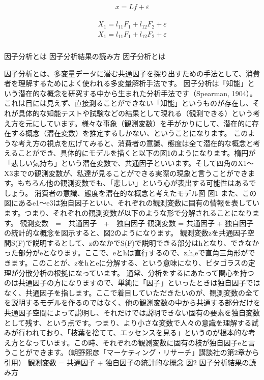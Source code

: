 \documentclass[a4j,11pt,mc, twocolumn]{jreport}
\begin{document}
		\begin{eqnarray}
		x=Lf+\varepsilon
		\end{eqnarray}

	\begin{eqnarray}
	\begin{split}
	X_1 =l_{11}F_1+l_{12}F_2+\varepsilon\\\nonumber
	X_1 =l_{11}F_1+l_{12}F_2+\varepsilon\\
	\end{split}
	\end{eqnarray}





%
%
%




	因子分析とは
	因子分析結果の読み方
	因子分析とは

	因子分析とは、多変量データに潜む共通因子を探り出すための手法として、消費者を理解するためによく使われる多変量解析手法です。
	因子分析は「知能」という潜在的な概念を研究する中から生まれた分析手法です（Spearman, 1904）。これは目には見えず、直接測ることができない「知能」というものが存在し、それが具体的な知能テストや試験などの結果として現れる（観測できる）という考え方を元にしています。様々な事象（観測変数）を手がかりにして、潜在的に存在する概念（潜在変数）を推定するしかない、ということになります。
	このような考え方の視点を広げてみると、消費者の意識、態度は全て潜在的な概念と考えることができ、具体的にモデルを描くと以下の図1のようになります。楕円が「悲しい気持ち」という潜在変数で、共通因子といいます。そして四角のX1～X3までの観測変数が、私達が見ることができる実際の現象と言うことができます。もちろん他の観測変数でも、「悲しい」という心が表出する可能性はあるでしょう。
	消費者の意識、態度を潜在的な概念と考えたモデル図
	図1
	また、この図にあるe1～e3は独自因子といい、それぞれの観測変数に固有の情報を表しています。つまり、それぞれの観測変数が以下のような形で分解されることになります。
	観測変数　=　共通因子　+　独自因子
	観測変数 = 共通因子 + 独自因子の統計的な概念を図示すると、図2のようになります。
	観測変数zを共通因子空間S(F)で説明するとして、zのなかでS(F)で説明できる部分はhとなり、できなかった部分がeとなります。ここで、eとhは直行するので、z,h,eで直角三角形ができます。このことが、zをhとeに分解する、という意味になり、ピタゴラスの定理が分散分析の根拠になっています。
	通常、分析をするにあたって関心を持つのは共通因子の方になりますので、単純に「因子」といったときは独自因子ではなく、共通因子を指します。ここで着目していただきたいのが、観測変数の全てを説明するモデルを作るのではなく、他の観測変数の中から共通する部分だけを共通因子空間によって説明し、それだけでは説明できない固有の要素を独自変数として残す、という点です。つまり、より小さな変数で人々の意識を理解する試みが行われており、「枝葉を捨てて、エッセンスを見る」というのが根本的な考え方となっています。この時、それぞれの観測変数に固有の枝が独自因子eと言うことができます。（朝野熙彦「マーケティング・リサーチ」講談社の第2章から引用）
	観測変数 = 共通因子 + 独自因子の統計的な概念
	図2
	因子分析結果の読み方
\end{document}
